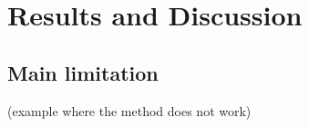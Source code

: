\section{Results and Discussion}

\subsection{Main limitation}

(example where the method does not work) 